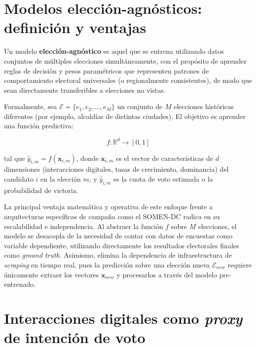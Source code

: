 \section{Modelos elección-agnósticos: definición y ventajas}

Un modelo \textbf{elección-agnóstico} es aquel que se entrena utilizando datos conjuntos de múltiples elecciones simultáneamente, con el propósito de aprender reglas de decisión y pesos paramétricos que representen patrones de comportamiento electoral universales (o regionalmente consistentes), de modo que sean directamente transferibles a elecciones no vistas.

Formalmente, sea $\mathcal{E} = \{e_1, e_2, \ldots, e_M\}$ un conjunto de $M$ elecciones históricas diferentes (por ejemplo, alcaldías de distintas ciudades). El objetivo es aprender una función predictiva:

\begin{equation}
  f: \mathbb{R}^d \rightarrow [0,1]
  \label{eq:modelo-agnostico}
\end{equation}

\noindent tal que $\hat{y}_{i,m} = f(\mathbf{x}_{i,m})$, donde $\mathbf{x}_{i,m}$ es el vector de características de $d$ dimensiones (interacciones digitales, tasas de crecimiento, dominancia) del candidato $i$ en la elección $m$, y $\hat{y}_{i,m}$ es la cuota de voto estimada o la probabilidad de victoria.

La principal ventaja matemática y operativa de este enfoque frente a arquitecturas específicas de campaña como el SOMEN-DC \parencite{brito2023somen} radica en su escalabilidad e independencia. Al abstraer la función $f$ sobre $M$ elecciones, el modelo se desacopla de la necesidad de contar con datos de encuestas como variable dependiente, utilizando directamente los resultados electorales finales como \textit{ground truth}. Asimismo, elimina la dependencia de infraestructura de \textit{scraping} en tiempo real, pues la predicción sobre una elección nueva $\mathcal{E}_{new}$ requiere únicamente extraer los vectores $\mathbf{x}_{new}$ y procesarlos a través del modelo pre-entrenado.

\section{Interacciones digitales como \textit{proxy} de intención de voto}

